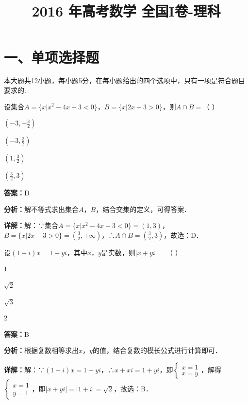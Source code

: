 ﻿\title{2016 年高考数学 全国I卷-理科}
\date{}
\maketitle

\section*{一、单项选择题}
本大题共12小题，每小题5分，在每小题给出的四个选项中，只有一项是符合题目要求的.

\begin{question}[points=5]
设集合$A=\{x|x^2-4x+3<0\}$，$B=\{x|2x-3>0\}$，则$A\cap B=$（ ）
\begin{choices}
  \item $(-3,-\frac{3}{2})$
  \item $(-3,\frac{3}{2})$
  \item $(1,\frac{3}{2})$
  \item $(\frac{3}{2},3)$
\end{choices}
\begin{solution}
\textbf{答案：}D

\textbf{分析：}解不等式求出集合$A$，$B$，结合交集的定义，可得答案．

\textbf{详解：}解：∵集合$A=\{x|x^2-4x+3<0\}=(1,3)$，$B=\{x|2x-3>0\}=(\frac{3}{2},+\infty)$，∴$A\cap B=(\frac{3}{2},3)$，故选：D．
\end{solution}
\end{question}

\begin{question}[points=5]
设$(1+i)x=1+yi$，其中$x$，$y$是实数，则$|x+yi|=$（ ）
\begin{choices}
  \item $1$
  \item $\sqrt{2}$
  \item $\sqrt{3}$
  \item $2$
\end{choices}
\begin{solution}
\textbf{答案：}B

\textbf{分析：}根据复数相等求出$x$，$y$的值，结合复数的模长公式进行计算即可．

\textbf{详解：}解：∵$(1+i)x=1+yi$，∴$x+xi=1+yi$，即$\begin{cases}x=1\\x=y\end{cases}$，解得$\begin{cases}x=1\\y=1\end{cases}$，即$|x+yi|=|1+i|=\sqrt{2}$，故选：B．
\end{solution}
\end{question}

